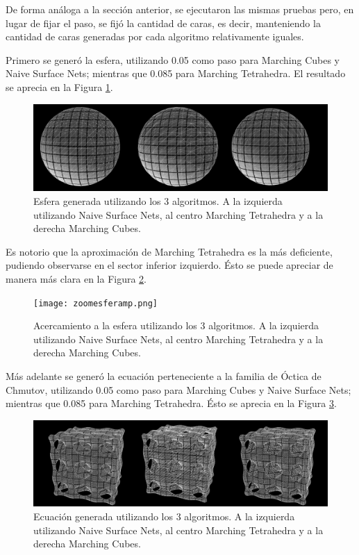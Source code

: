 \documentclass[12pt]{article}
\begin{document}
De forma análoga a la sección anterior, se ejecutaron las mismas pruebas pero, en lugar de fijar el paso, se fijó la cantidad de caras, es decir, manteniendo la cantidad de caras generadas por cada algoritmo relativamente iguales.

Primero se generó la esfera, utilizando 0.05 como paso para Marching Cubes y Naive Surface Nets; mientras que 0.085 para Marching Tetrahedra. El resultado se aprecia en la Figura \ref{esfera22G}.

\begin{figure}[h!]
\includegraphics[width=\linewidth,center]{esfera2.png}
\caption{Esfera generada utilizando los 3 algoritmos.  A la izquierda utilizando Naive Surface Nets, al centro Marching Tetrahedra y a la derecha Marching Cubes.}
\label{esfera22G}
\end{figure}

Es notorio que la aproximación de Marching Tetrahedra es la más deficiente, pudiendo observarse en el sector inferior izquierdo. Ésto se puede apreciar de manera más clara en la Figura \ref{sinNombre}.

\begin{figure}[h!]
\texttt{[image: zoomesferamp.png]}
\caption{Acercamiento a la esfera utilizando los 3 algoritmos.  A la izquierda utilizando Naive Surface Nets, al centro Marching Tetrahedra y a la derecha Marching Cubes.}
\label{sinNombre}
\end{figure}

Más adelante se generó la ecuación perteneciente a la familia de Óctica de Chmutov, utilizando 0.05 como paso para Marching Cubes y Naive Surface Nets; mientras que 0.085 para Marching Tetrahedra. Ésto se aprecia en la Figura \ref{ecuacion22G}.

\begin{figure}[h!]
\includegraphics[width=\linewidth,center]{ecuacion2.png}
\caption{Ecuación generada utilizando los 3 algoritmos.  A la izquierda utilizando Naive Surface Nets, al centro Marching Tetrahedra y a la derecha Marching Cubes.}
\label{ecuacion22G}
\end{figure}
\end{document}
